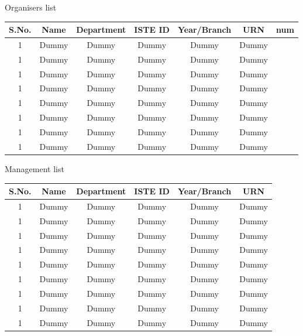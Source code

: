 \documentclass[12pt, a4 paper]{article}
\begin{document}
\begin{center}
\huge Organisers list
\end{center}

\begin{table}[h!]
  \begin{center}
    \begin{tabular}{|c|c|c|c|c|c| c |} 
    \toprule %
      \textbf{S.No.} & \textbf{Name} & \textbf{Department} & \textbf{ISTE ID} &\textbf{Year/Branch} & \textbf{URN} & num \\
      \midrule %
      1 & Dummy & Dummy & Dummy & Dummy & Dummy & \\
      1 & Dummy & Dummy & Dummy & Dummy & Dummy & \\
      1 & Dummy & Dummy & Dummy & Dummy & Dummy & \\
      1 & Dummy & Dummy & Dummy & Dummy & Dummy &\\
      1 & Dummy & Dummy & Dummy & Dummy & Dummy & \\
      1 & Dummy & Dummy & Dummy & Dummy & Dummy & \\
      1 & Dummy & Dummy & Dummy & Dummy & Dummy &\\
      1 & Dummy & Dummy & Dummy & Dummy & Dummy & \\
      \bottomrule %
    \end{tabular}
  \end{center}
\end{table}


\begin{center}
\huge Management list
\end{center}

\begin{table}[h!]
  \begin{center}
    \begin{tabular}{|c|c|c|c|c|c|} 
    \toprule %
      \textbf{S.No.} & \textbf{Name} & \textbf{Department} & \textbf{ISTE ID} &\textbf{Year/Branch} & \textbf{URN}\\
      \midrule %
      1 & Dummy & Dummy & Dummy & Dummy & Dummy\\
      1 & Dummy & Dummy & Dummy & Dummy & Dummy \\
      1 & Dummy & Dummy & Dummy & Dummy & Dummy \\
      1 & Dummy & Dummy & Dummy & Dummy & Dummy\\
      1 & Dummy & Dummy & Dummy & Dummy & Dummy \\
      1 & Dummy & Dummy & Dummy & Dummy & Dummy \\
      1 & Dummy & Dummy & Dummy & Dummy & Dummy\\
      1 & Dummy & Dummy & Dummy & Dummy & Dummy\\
      1 & Dummy & Dummy & Dummy & Dummy & Dummy\\
      \bottomrule %
    \end{tabular}
  \end{center}
\end{table}
\end{document}
